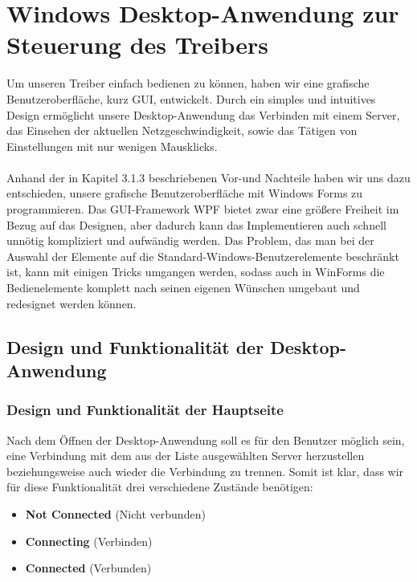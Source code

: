 \chapter{Windows Desktop-Anwendung zur Steuerung des Treibers}
\label{chap:WindowsDesktop-AnwendungzurSteuerungdesTreibers}

\lstset{basicstyle=\normalsize}

Um unseren Treiber einfach bedienen zu können, haben wir eine grafische Benutzeroberfläche, kurz GUI, entwickelt. Durch ein simples und intuitives Design ermöglicht unsere Desktop-Anwendung das Verbinden mit einem Server, das Einsehen der aktuellen Netzgeschwindigkeit, sowie das Tätigen von Einstellungen mit nur wenigen Mausklicks. 
\\ \ \\
Anhand der in Kapitel 3.1.3 beschriebenen Vor-und Nachteile haben wir uns dazu entschieden, unsere grafische Benutzeroberfläche mit Windows Forms zu programmieren.
Das GUI-Framework WPF bietet zwar eine größere Freiheit im Bezug auf das Designen, aber dadurch kann das Implementieren auch schnell unnötig kompliziert und aufwändig werden. Das Problem, das man bei der Auswahl der Elemente auf die Standard-Windows-Benutzerelemente beschränkt ist, kann mit einigen Tricks umgangen werden, sodass auch in WinForms die Bedienelemente komplett nach seinen eigenen Wünschen umgebaut und redesignet werden können.

\section{Design und Funktionalität der Desktop-Anwendung}

\subsection{Design und Funktionalität der Hauptseite}

Nach dem Öffnen der Desktop-Anwendung soll es für den Benutzer möglich sein, eine Verbindung mit dem aus der Liste ausgewählten Server herzustellen beziehungsweise auch wieder die Verbindung zu trennen. Somit ist klar, dass wir für diese Funktionalität drei verschiedene Zustände benötigen:
\\
\begin{itemize}
 \item \textbf{Not Connected} (Nicht verbunden)
 \item \textbf{Connecting} (Verbinden)
 \item \textbf{Connected} (Verbunden)
\end{itemize}
\bigskip

